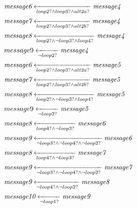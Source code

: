 \begin{align*}
	&\transitionentry[\fragmessage{message4}]{\fragcond{loop2} \land \fragcond{loop3} \land \fragcond{alt2a}}{\fragmessage{message6}} \\
	&\transitionentry[\fragmessage{message4}]{\fragcond{loop2} \land \fragcond{loop3} \land \fragcond{alt2b}}{\fragmessage{message7}} \\
	&\transitionentry[\fragmessage{message4}]{\fragcond{loop2} \land \lnot \fragcond{loop3} \land \fragcond{loop4}}{\fragmessage{message8}} \\
	&\transitionentry[\fragmessage{message4}]{\lnot \fragcond{loop2}}{message9} \\
	&\transitionentry[\fragmessage{message5}]{\fragcond{loop2} \land \fragcond{loop3} \land \fragcond{alt2a}}{\fragmessage{message6}} \\
	&\transitionentry[\fragmessage{message5}]{\fragcond{loop2} \land \fragcond{loop3} \land \fragcond{alt2b}}{\fragmessage{message7}} \\
	&\transitionentry[\fragmessage{message5}]{\fragcond{loop2} \land \lnot \fragcond{loop3} \land \fragcond{loop4}}{\fragmessage{message8}} \\
	&\transitionentry[\fragmessage{message5}]{\lnot \fragcond{loop2}}{message9} \\
	&\transitionentry[\fragmessage{message6}]{\fragcond{loop4} \land \lnot \fragcond{loop3}}{\fragmessage{message8}} \\
	&\transitionentry[\fragmessage{message6}]{\lnot \fragcond{loop3} \land \lnot \fragcond{loop4} \land \lnot \fragcond{loop2}}{\fragmessage{message9}} \\
	&\transitionentry[\fragmessage{message7}]{\fragcond{loop4} \land \lnot \fragcond{loop3}}{\fragmessage{message8}} \\
	&\transitionentry[\fragmessage{message7}]{\lnot \fragcond{loop3} \land \lnot \fragcond{loop4} \land \lnot \fragcond{loop2}}{\fragmessage{message9}} \\
	&\transitionentry[\fragmessage{message8}]{\lnot \fragcond{loop4} \land \lnot \fragcond{loop2}}{\fragmessage{message9}} \\
	&\transitionentry[\fragmessage{message9}]{\lnot \fragcond{loop1}}{\fragmessage{message10}}
\end{align*}

